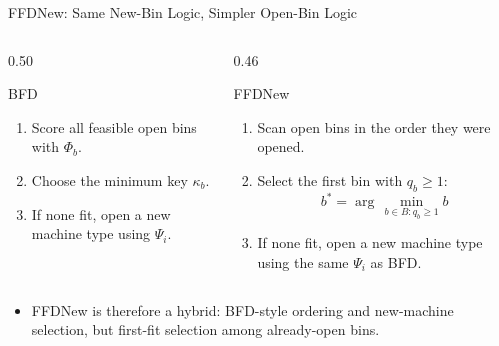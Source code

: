 \documentclass[aspectratio=169,10pt]{beamer}
\begin{document}
\begin{frame}{FFDNew: Same New-Bin Logic, Simpler Open-Bin Logic}
  \begin{columns}[T,totalwidth=\textwidth]
    \begin{column}{0.50\textwidth}
      \begin{block}{BFD}
        \begin{enumerate}
          \item Score all feasible open bins with $\Phi_b$.
          \item Choose the minimum key $\kappa_b$.
          \item If none fit, open a new machine type using $\Psi_i$.
        \end{enumerate}
      \end{block}
    \end{column}
    \begin{column}{0.46\textwidth}
      \begin{block}{FFDNew}
        \begin{enumerate}
          \item Scan open bins in the order they were opened.
          \item Select the first bin with $q_b\geq 1$:
          \[
            b^*=\arg\,\min_{b\in B:q_b\geq 1} b
          \]
          \item If none fit, open a new machine type using the same $\Psi_i$ as BFD.
        \end{enumerate}
      \end{block}
    \end{column}
  \end{columns}
  \vspace{0.15cm}
  \begin{itemize}
    \item FFDNew is therefore a hybrid: BFD-style ordering and new-machine selection, but first-fit selection among already-open bins.
  \end{itemize}
\end{frame}
\end{document}
